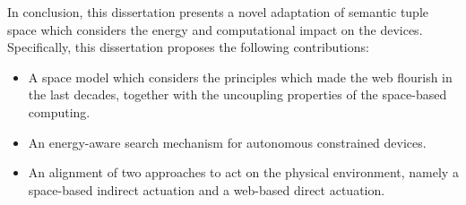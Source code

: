 \begin{abstracts}
In conclusion, this dissertation presents a novel adaptation of semantic tuple space which considers the energy and computational impact on the devices.
Specifically, this dissertation proposes the following contributions:
\begin{itemize}
  \item A space model which considers the principles which made the web flourish in the last decades, together with the uncoupling properties of the space-based computing.
  \item An energy-aware search mechanism for autonomous constrained devices.
  \item An alignment of two approaches to act on the physical environment, namely a space-based indirect actuation and a web-based direct actuation.
\end{itemize}

\end{abstracts}



